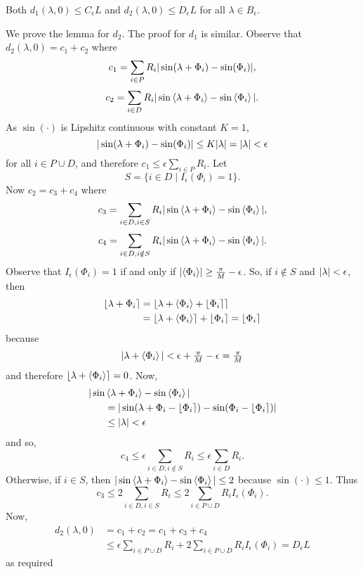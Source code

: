 \documentclass[journal]{IEEEtran}
\begin{document}
\begin{lemma}\label{lem:epslmlemma}
Both $d_1(\lambda, 0) \leq C_\epsilon L $ and $d_2(\lambda, 0) \leq D_\epsilon L$ for all $\lambda \in B_\epsilon$.
\end{lemma}
\begin{IEEEproof}
We prove the lemma for $d_2$.  The proof for $d_1$ is similar.  Observe that $d_2(\lambda, 0) = c_1 + c_2$ where 
 \[
 c_1 = \sum_{i \in P} R_i{\vert \sin(\lambda + \Phi_i) - \sin(\Phi_i)  \vert},
 \] 
 \[
 c_2 = \sum_{i \in D} R_i {\vert \sin\left\langle \lambda + \Phi_i \right\rangle - \sin\left\langle \Phi_i \right\rangle \vert}.
 \]
 As $\sin(\cdot)$ is Lipshitz continuous with constant $K=1$,
 \[
 {\vert \sin(\lambda + \Phi_i) - \sin(\Phi_i) \vert} \leq K{\vert \lambda \vert} = {\vert \lambda \vert} < \epsilon
 \]
 for all $i \in P \cup D$, and therefore $c_1 \leq \epsilon \sum_{i \in P} R_i$.  Let 
\[
S = \{ i \in D \mid I_\epsilon(\Phi_i) = 1\}.
\] 
Now $c_2 = c_3 + c_4$ where 
 \[
 c_3 = \sum_{i \in D, i \in S} R_i {\vert \sin\left\langle \lambda + \Phi_i \right\rangle - \sin\left\langle \Phi_i \right\rangle \vert},
 \]
 \[
 c_4 =  \sum_{i \in D, i \notin S} R_i {\vert \sin\left\langle \lambda + \Phi_i \right\rangle - \sin\left\langle \Phi_i \right\rangle \vert}.
 \]
Observe that $I_\epsilon(\Phi_i) = 1$ if and only if ${\left\vert \left\langle \Phi_i \right\rangle \right\vert} \geq \tfrac{\pi}{M} - \epsilon$.  So, if $i \notin S$ and ${\vert \lambda \vert} < \epsilon$, then
\begin{align*}
{\left\lfloor \lambda + \Phi_i \right\rceil} &= {\left\lfloor \lambda + \left\langle \Phi_i \right\rangle + {\left\lfloor \Phi_i \right\rceil} \right\rceil} \\ 
&= {\left\lfloor \lambda + \left\langle \Phi_i \right\rangle \right\rceil} + {\left\lfloor \Phi_i \right\rceil} = {\left\lfloor \Phi_i \right\rceil}
\end{align*}
because
\[
{\vert \lambda + \left\langle \Phi_i \right\rangle \vert} < \epsilon + \tfrac{\pi}{M} - \epsilon = \tfrac{\pi}{M}
\] 
and therefore ${\left\lfloor \lambda + \left\langle \Phi_i \right\rangle \right\rceil} = 0$.  Now,
 \begin{align*}
 \vert\sin&\left\langle \lambda + \Phi_i \right\rangle - \sin\left\langle \Phi_i \right\rangle\vert \\
 &= {\vert \sin(\lambda + \Phi_i - {\left\lfloor \Phi_i \right\rceil}) - \sin(\Phi_i - {\left\lfloor \Phi_i \right\rceil}) \vert} \\
 &\leq {\vert \lambda \vert} < \epsilon
 \end{align*}
and so, 
\[
c_4 \leq \epsilon \sum_{i \in D, i \notin S} R_i \leq \epsilon \sum_{i \in D} R_i.
\]
Otherwise, if $i \in S$, then ${\vert \sin\left\langle \lambda + \Phi_i \right\rangle - \sin\left\langle \Phi_i \right\rangle \vert} \leq 2$ because $\sin(\cdot) \leq 1$.  Thus 
\[
c_3 \leq 2 \sum_{i \in D, i \in S} R_i \leq 2 \sum_{i \in P \cup D} R_i I_\epsilon(\Phi_i).
\]
Now,
\begin{align*}
d_2(\lambda, 0) &= c_1 + c_2 = c_1 + c_3 + c_4 \\
&\leq \epsilon \sum_{i \in P \cup D} R_i + 2 \sum_{i \in P \cup D} R_i I_\epsilon(\Phi_i) = D_\epsilon L
\end{align*}
as required
\end{IEEEproof}
\end{document}
